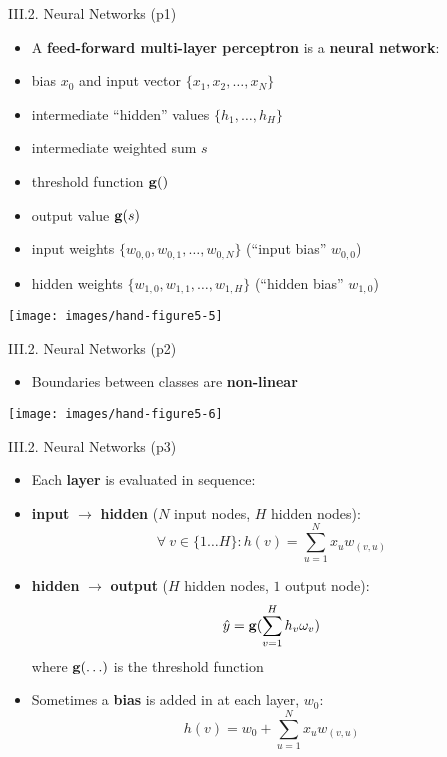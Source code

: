 \documentclass[handout]{beamer}
\newcommand{\strong}[1]{\textbf{\color{teal} #1}}
\newcommand{\stronger}[1]{\textbf{\color{purple} #1}}
\begin{document}
\begin{frame}{III.2. Neural Networks (p1)}
\begin{itemize}
\item[] A \strong{feed-forward multi-layer perceptron} is a \stronger{neural network}:
\item bias $x_0$ and input vector $\{x_1, x_2, \ldots, x_N\}$
\item intermediate ``hidden'' values $\{h_1, \ldots, h_H\}$
\item intermediate weighted sum $s$
\item threshold function ${\bf g}()$
\item output value ${\bf g}(s)$
\item input weights $\{w_{0,0}, w_{0,1}, \ldots, w_{0,N}\}$ (``input bias'' $w_{0,0}$)
\item hidden weights $\{w_{1,0}, w_{1,1}, \ldots, w_{1,H}\}$ (``hidden bias'' $w_{1,0}$)
\end{itemize}
\begin{center}
\texttt{[image: images/hand-figure5-5]}\\
\cite[based on Figure 5.5]{hand-et-al:2001}
\end{center}
\end{frame}
\begin{frame}{III.2. Neural Networks (p2)}
\begin{itemize}
\item Boundaries between classes are \stronger{non-linear}
\end{itemize}
\begin{center}
\texttt{[image: images/hand-figure5-6]}\\
\cite[Figure 5.6]{hand-et-al:2001}
\end{center}
\end{frame}
\begin{frame}{III.2. Neural Networks (p3)}
\begin{itemize}
\item Each \strong{layer} is evaluated in sequence:
\item[1] \strong{input} $\rightarrow$ \strong{hidden} ($N$ input nodes, $H$ hidden nodes):
\[
\forall ~ v \in \{1 \ldots H\} : h(v) = \sum_{u=1}^N{ x_u w_{(v,u)} }
\]
\item[2] \strong{hidden} $\rightarrow$ \strong{output} ($H$ hidden nodes, $1$ output node):
\[
\hat{y} = {\bf g}(\sum_{v=1}^H{ h_v \omega_v })
\]
where ${\bf g}(\ldots)$ is the threshold function
\item Sometimes a \strong{bias} is added in at each layer, $w_0$:
\[
h(v) = w_0 + \sum_{u=1}^N{ x_u w_{(v,u)} }
\]
\end{itemize}
\end{frame}
\end{document}
